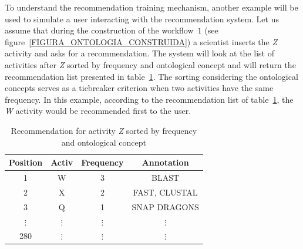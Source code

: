 \documentclass[10pt,letterpaper]{article}
\begin{document}
To understand the recommendation training mechanism, another example will be used to simulate a user interacting with the recommendation system. Let us assume that during the construction of the workflow~\(1\) (see figure~\ref{FIGURA_ONTOLOGIA_CONSTRUIDA}) a scientist inserts the \emph{Z} activity and asks for a recommendation. The system will look at the list of activities after \emph{Z} sorted by frequency and ontological concept and will return the recommendation list presented in table~\ref{tabela_lista_recomendacao_ordenada_frequencia}. The sorting considering the ontological concepts serves as a tiebreaker criterion when two activities have the same frequency. In this example, according to the recommendation list of table~\ref{tabela_lista_recomendacao_ordenada_frequencia}, the \emph{W} activity would be recommended first to the user.


\begin{table}[!htb]
	\centering
	\caption{Recommendation for activity \emph{Z} sorted by frequency and ontological concept}
	\begin{tabular}{|c|c|c|c|}  \hline
		\textbf{Position} & \textbf{Activ} & \textbf{Frequency} & \textbf{Annotation} 	\\ \hline
		1				& W 				& 3 				& BLAST				\\ \hline
		2				& X 				& 2 				& FAST, CLUSTAL		\\ \hline
		3				& Q 				& 1 				& SNAP DRAGONS		\\ \hline
		\(\vdots\)		& \(\vdots\)		& \(\vdots\) 		& \(\vdots\)		\\ \hline
		280				& \(\vdots\)		& \(\vdots\)		& \(\vdots\)	\\ \hline
	\end{tabular}
	\label{tabela_lista_recomendacao_ordenada_frequencia}
	\vspace{0.1cm}
\end{table}
\end{document}
